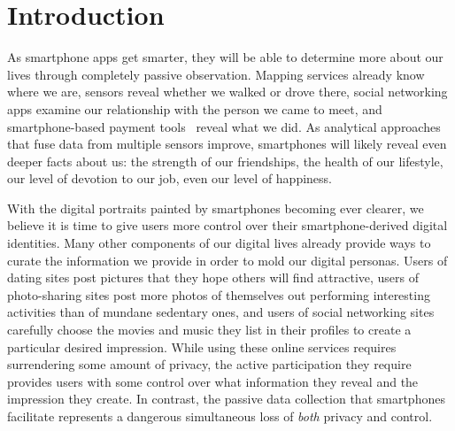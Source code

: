 
\section{Introduction}
\label{sec-introduction}

As smartphone apps get smarter, they will be able to determine more
about our lives through completely passive observation. Mapping services
already know where we are, sensors reveal whether we walked or drove there,
social networking apps examine our relationship with the person we came
to meet, and smartphone-based payment tools~\cite{googlewallet-url}
reveal what we did. As analytical approaches that fuse data from multiple
sensors improve, smartphones will likely reveal even deeper facts about
us: the strength of our friendships, the health of our lifestyle, our
level of devotion to our job, even our level of happiness.

With the digital portraits painted by smartphones becoming ever clearer, we
believe it is time to give users more control over their smartphone-derived
digital identities. Many other components of our digital lives already
provide ways to curate the information we provide in order to mold our
digital personas. Users of dating sites post pictures that they hope others
will find attractive, users of photo-sharing sites post more photos of
themselves out performing interesting activities than of mundane sedentary
ones, and users of social networking sites carefully choose the movies
and music they list in their profiles to create a particular desired
impression. While using these online services requires surrendering some
amount of privacy, the active participation they require provides users with
some control over what information they reveal and the impression they
create. In contrast, the passive data collection that smartphones facilitate
represents a dangerous simultaneous loss of \textit{both} privacy and control.


